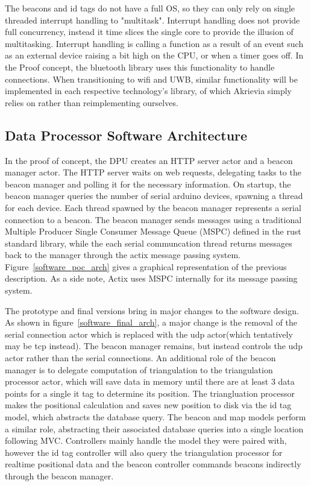 The beacons and id tags do not have a full OS, so they can only rely on single threaded interrupt handling to "multitask".
Interrupt handling does not provide full concurrency, instead it time slices the single core to provide the illusion of multitasking.
Interrupt handling is calling a function as a result of an event such as an external device raising a bit high on the CPU, or when a timer goes off.
In the Proof concept, the bluetooth library uses this functionality to handle connections.
When transitioning to wifi and UWB, similar functionality will be implemented in each respective technology's library, of which Akrievia simply relies on rather than reimplementing ourselves.

\bigskip
\subsection{Data Processor Software Architecture}
In the proof of concept, the DPU creates an HTTP server actor and a beacon manager actor.
The HTTP server waits on web requests, delegating tasks to the beacon manager and polling it for the necessary information.
On startup, the beacon manager queries the number of serial arduino devices, spawning a thread for each device.
Each thread spawned by the beacon manager represents a serial connection to a beacon.
The beacon manager sends messages using a traditional Multiple Producer Single Consumer Message Queue (MSPC) defined in the rust standard library, while the each serial communcation thread returns messages back to the manager through the actix message passing system.
Figure~\ref{software_poc_arch} gives a graphical representation of the previous description.
As a side note, Actix uses MSPC internally for its message passing system.

\bigskip
The prototype and final versions bring in major changes to the software design.
As shown in figure~\ref{software_final_arch}, a major change is the removal of the serial connection actor which is replaced with the udp actor(which tentatively may be tcp instead).
The beacon manager remains, but instead controls the udp actor rather than the serial connections.
An additional role of the beacon manager is to delegate computation of triangulation to the triangulation processor actor, which will save data in memory until there are at least 3 data points for a single it tag to determine its position.
The triangluation processor makes the positional calculation and saves new position to disk via the id tag model, which abstracts the database query.
The beacon and map models perform a similar role, abstracting their associated database queries into a single location following MVC.
Controllers mainly handle the model they were paired with, however the id tag controller will also query the triangulation processor for realtime positional data and the beacon controller commands beacons indirectly through the beacon manager.

